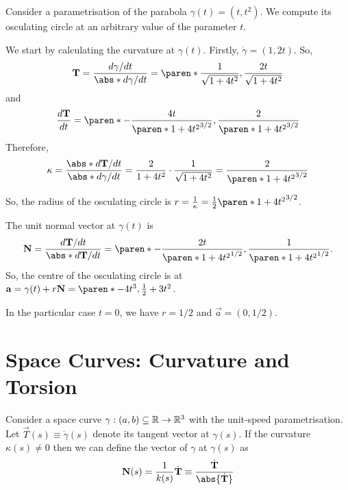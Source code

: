 \documentclass[11pt]{penrose}
\newcommand{\vT}{\vec{T}}
\newcommand{\vN}{\vec{N}}
\begin{document}
\begin{negg}
    Consider a parametrisation of the parabola $\gamma(t) = (t, t^2)$. We compute its osculating circle at an arbitrary value of the parameter $t$.

    We start by calculating the curvature at $\gamma(t)$. Firstly, $\dot{\gamma} = (1, 2t)$. So,
    \begin{equation}
        \vT = \frac{d\gamma/dt}{\abs*{ d\gamma/dt }} = \paren*{ \frac{1}{\sqrt{1 + 4t^2}}, \frac{2t}{\sqrt{1 + 4t^2}} }
    \end{equation}
    and
    \begin{equation}
        \frac{d\vT}{dt} = \paren*{ -\frac{4t}{\paren*{1+4t^2}^{3/2}}, \frac{2}{\paren*{1+4t^2}^{3/2}} }
    \end{equation}
    Therefore,
    \begin{equation}
        \kappa
        = \frac{\abs*{ d\vT/dt }}{\abs*{ d\gamma/dt }}
        = \frac{2}{1+4t^2} \cdot \frac{1}{\sqrt{1 + 4t^2}}
        = \frac{2}{ \paren*{1+4t^2}^{3/2} }
    \end{equation}

    So, the radius of the osculating circle is $r = \frac{1}{\kappa} = \frac{1}{2}\paren*{1+4t^2}^{3/2}$.

    The unit normal vector at $\gamma(t)$ is
    \begin{equation}
        \vN
        = \frac{ d\vT/dt }{\abs*{ d\vT/dt }}
        = \paren*{ -\frac{2t}{\paren*{1+4t^2}^{1/2}}, \frac{1}{\paren*{1+4t^2}^{1/2}} }.
    \end{equation}
    So, the centre of the osculating circle is at $\vec{a} = \gamma(t) + r\vN = \paren*{ -4 t^3, \frac{1}{2} + 3t^2 }$.

    In the particular case $t=0$, we have $r = 1/2$ and $\vec{a} = (0, 1/2)$.
\end{negg}

\section{Space Curves: Curvature and Torsion}
Consider a space curve $\gamma : (a, b) \subseteq \mathbb{R} \to \mathbb{R}^3$ with the unit-speed parametrisation. Let $\vT(s) \equiv \dot{\gamma}(s)$ denote its tangent vector at $\gamma(s)$. If the curvature $\kappa(s) \neq 0$ then we can define the  vector of $\gamma$ at $\gamma(s)$ as
\begin{equation}
    \vN(s) = \frac{1}{k(s)} \dot{\vT} \equiv \frac{\dot{\vT}}{\abs{\dot{\vT}}}
    \label{eq:principal-normal-dfn}
\end{equation}
\end{document}
